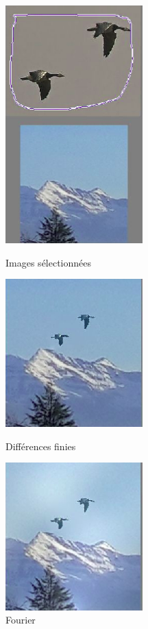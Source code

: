 \begin{figure}[!htb]
   \begin{minipage}{0.33\textwidth}
     \centering
     \includegraphics[width = 150pt]{Images/Resultats/OiseauMont.png}
     \caption{Images sélectionnées}
      \end{minipage}\hfill
   \begin{minipage}{0.33\textwidth}
     \centering
     \includegraphics[width = 150pt]{Images/Resultats/oiseauRenduDF.png}
     \caption{Différences finies}
      \end{minipage}\hfill
   \begin{minipage}{0.33\textwidth}
     \centering
     \includegraphics[width= 150pt]{Images/Resultats/OiseauRenduFourier.png}
     \caption{Fourier}
   \end{minipage}
\end{figure}

